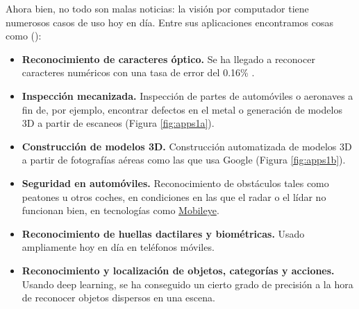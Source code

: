 Ahora bien, no todo son malas noticias: la visión por computador tiene numerosos casos de uso hoy en día. Entre sus aplicaciones encontramos cosas como (\citeauthor*{book:szeliski}):
\begin{itemize}
  \item \textbf{Reconocimiento de caracteres óptico.} Se ha llegado a reconocer caracteres numéricos con una tasa de error del 0.16\% \cite{byerly2020branching}.
  \item \textbf{Inspección mecanizada.} Inspección de partes de automóviles o aeronaves a fin de, por ejemplo, encontrar defectos en el metal o generación de modelos 3D a partir de escaneos (Figura \ref{fig:apps1a}).
  \item \textbf{Construcción de modelos 3D.} Construcción automatizada de modelos 3D a partir de fotografías aéreas como las que usa Google
        (Figura \ref{fig:apps1b}).
  \item \textbf{Seguridad en automóviles.} Reconocimiento de obstáculos tales como peatones u otros coches, en condiciones en las que el radar o el lídar no funcionan bien, en tecnologías como \href{https://www.mobileye.com/}{Mobileye}.
  \item \textbf{Reconocimiento de huellas dactilares y biométricas.} Usado ampliamente hoy en día en teléfonos móviles.
  \item \textbf{Reconocimiento y localización de objetos, categorías y acciones.} Usando deep learning, se ha conseguido un cierto grado de precisión a la hora de reconocer objetos dispersos en una escena.
\end{itemize}

